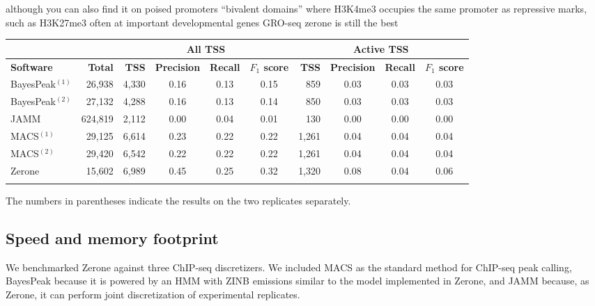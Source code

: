 \documentclass{bioinfo}
\begin{document}
although you can also find it on poised promoters
“bivalent domains” where H3K4me3 occupies the same promoter as
repressive marks, such as H3K27me3 often at important developmental
genes \citep{pmid16630819}
GRO-seq
zerone is still the best

\begin{table}[!t]
{\begin{tabular}{lr|rccc|rccc}
        \toprule
        & & \multicolumn{4}{c}{\textbf{All TSS}} & \multicolumn{4}{c}{\textbf{Active TSS}} \\
        \midrule
        \textbf{Software}  & \textbf{Total}  &
        \textbf{TSS} & \textbf{Precision} & \textbf{Recall} & \textbf{$F_{1}$ score} &
        \textbf{TSS} & \textbf{Precision} & \textbf{Recall} & \textbf{$F_{1}$ score} \\
        \midrule
        BayesPeak$^{(1)}$ &  26,938 & 4,330 & 0.16 & 0.13 & 0.15 &   859 & 0.03 & 0.03 & 0.03 \\
        BayesPeak$^{(2)}$ &  27,132 & 4,288 & 0.16 & 0.13 & 0.14 &   850 & 0.03 & 0.03 & 0.03 \\
        JAMM              & 624,819 & 2,112 & 0.00 & 0.04 & 0.01 &   130 & 0.00 & 0.00 & 0.00 \\
        MACS$^{(1)}$      &  29,125 & 6,614 & 0.23 & 0.22 & 0.22 & 1,261 & 0.04 & 0.04 & 0.04 \\
        MACS$^{(2)}$      &  29,420 & 6,542 & 0.22 & 0.22 & 0.22 & 1,261 & 0.04 & 0.04 & 0.04 \\
        Zerone            &  15,602 & 6,989 & 0.45 & 0.25 & 0.32 & 1,320 & 0.08 & 0.04 & 0.06 \\
        \botrule
\end{tabular}}{The numbers in parentheses indicate the results on the two
replicates separately.}
\end{table}

\subsection{Speed and memory footprint}
We benchmarked Zerone against three ChIP-seq discretizers.
We included MACS as the standard method for ChIP-seq peak calling,
BayesPeak because it is powered by an HMM with ZINB emissions
similar to the model implemented in Zerone, and JAMM because, as
Zerone, it can perform joint discretization of experimental replicates.
\end{document}
